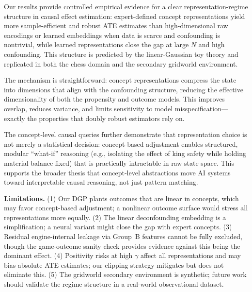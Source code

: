 \documentclass[11pt]{article}
\begin{document}
Our results provide controlled empirical evidence for a clear representation-regime
structure in causal effect estimation: expert-defined concept representations yield
more sample-efficient and robust ATE estimates than high-dimensional raw encodings
or learned embeddings when data is scarce and confounding is nontrivial, while
learned representations close the gap at large $N$ and high confounding. This
structure is predicted by the linear-Gaussian toy theory and replicated in both the
chess domain and the secondary gridworld environment.

The mechanism is straightforward: concept representations compress the state into
dimensions that align with the confounding structure, reducing the effective
dimensionality of both the propensity and outcome models. This improves overlap,
reduces variance, and limits sensitivity to model misspecification---exactly the
properties that doubly robust estimators rely on.

The concept-level causal queries further demonstrate that representation choice is
not merely a statistical decision: concept-based adjustment enables structured,
modular ``what-if'' reasoning (e.g., isolating the effect of king safety while
holding material balance fixed) that is practically intractable in raw state space.
This supports the broader thesis that concept-level abstractions move AI systems
toward interpretable causal reasoning, not just pattern matching.

\textbf{Limitations.}
(1) Our DGP plants outcomes that are linear in concepts, which may favor
concept-based adjustment; a nonlinear outcome surface would stress all
representations more equally.
(2) The linear deconfounding embedding is a simplification; a neural variant might
close the gap with expert concepts.
(3) Residual engine-internal leakage via Group~B features cannot be fully excluded,
though the game-outcome sanity check provides evidence against this being the
dominant effect.
(4) Positivity risks at high $\gamma$ affect all representations and may bias
absolute ATE estimates; our clipping strategy mitigates but does not eliminate this.
(5) The gridworld secondary environment is synthetic; future work should validate
the regime structure in a real-world observational dataset.



\end{document}
